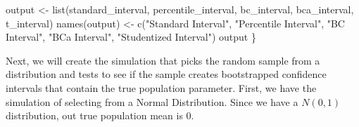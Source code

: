 \documentclass[12pt]{article}
\newenvironment{Shaded}{\begin{snugshade}}{\end{snugshade}}
\newcommand{\FunctionTok}[1]{\textcolor[rgb]{0.00,0.00,0.00}{#1}}
\newcommand{\NormalTok}[1]{#1}
\newcommand{\OtherTok}[1]{\textcolor[rgb]{0.56,0.35,0.01}{#1}}
\newcommand{\StringTok}[1]{\textcolor[rgb]{0.31,0.60,0.02}{#1}}
\begin{document}
\begin{Shaded}
\begin{Highlighting}[]
\NormalTok{  output }\OtherTok{\textless{}{-}} \FunctionTok{list}\NormalTok{(standard\_interval, percentile\_interval, bc\_interval, }
\NormalTok{                 bca\_interval, t\_interval)}
  \FunctionTok{names}\NormalTok{(output) }\OtherTok{\textless{}{-}} \FunctionTok{c}\NormalTok{(}\StringTok{"Standard Interval"}\NormalTok{, }\StringTok{"Percentile Interval"}\NormalTok{, }\StringTok{"BC Interval"}\NormalTok{, }
                     \StringTok{"BCa Interval"}\NormalTok{, }\StringTok{"Studentized Interval"}\NormalTok{)}
\NormalTok{  output}
\NormalTok{\}}
\end{Highlighting}
\end{Shaded}

Next, we will create the simulation that picks the random sample from a
distribution and tests to see if the sample creates bootstrapped
confidence intervals that contain the true population parameter. First,
we have the simulation of selecting from a Normal Distribution. Since we
have a \(N(0,1)\) distribution, out true population mean is 0.
\end{document}
